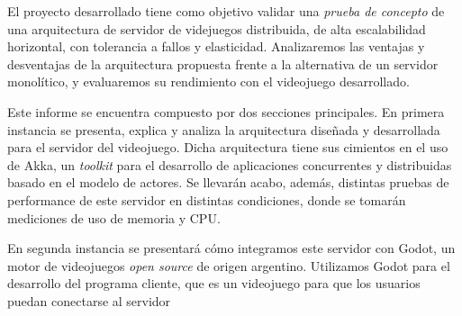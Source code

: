 \noindent El proyecto desarrollado tiene como objetivo validar una \textit{prueba de concepto} de
una arquitectura de servidor de videjuegos distribuida, de alta escalabilidad horizontal,
con tolerancia a fallos y elasticidad. Analizaremos las ventajas y desventajas de la arquitectura
propuesta frente a la alternativa de un servidor monolítico, y evaluaremos su rendimiento
con el videojuego desarrollado.
 
Este informe se encuentra compuesto por dos secciones principales. En primera
instancia se presenta, explica y analiza la arquitectura diseñada y desarrollada para el
servidor del videojuego. Dicha arquitectura tiene sus cimientos en el uso de Akka, un 
\textit{toolkit} para el desarrollo de aplicaciones concurrentes y distribuidas basado
en el modelo de actores. Se llevarán acabo, además, distintas pruebas de performance de este
servidor en distintas condiciones, donde se tomarán mediciones de uso de memoria y CPU.

En segunda instancia se presentará cómo integramos este servidor
con Godot, un motor de videojuegos \textit{open source} de origen argentino. Utilizamos Godot
para el desarrollo del programa cliente, que es un videojuego para que los usuarios puedan
conectarse al servidor


